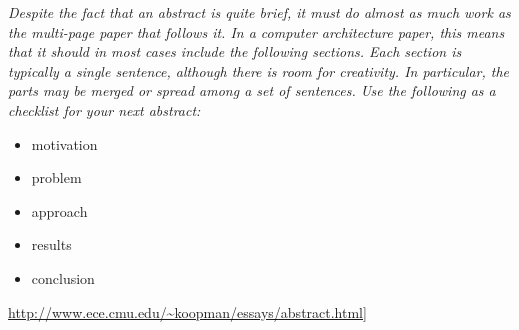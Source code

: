 \textit{
Despite the fact that an abstract is quite brief, it must do almost as much work as the multi-page paper that follows it. 
In a computer architecture paper, this means that it should in most cases include the following sections.
Each section is typically a single sentence, although there is room for creativity. 
In particular, the parts may be merged or spread among a set of sentences. Use the following as a checklist for your next abstract: 
}

\begin{itemize}
 \item motivation
 \item problem
 \item approach
 \item results
 \item conclusion
\end{itemize}

\url{http://www.ece.cmu.edu/~koopman/essays/abstract.html}]

\tableofcontents
\listoffigures



